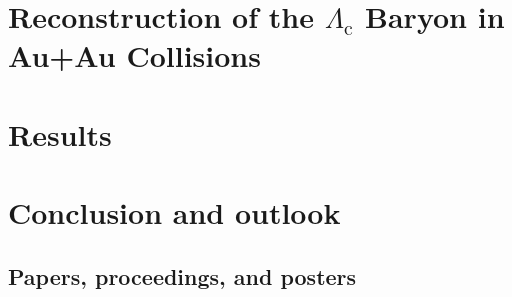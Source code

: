 \documentclass[a4paper,titlepage,11pt,twoside,openright]{report} %
\newcommand{\Lambdac}{\ensuremath{{\Lambda_\text{c}}}}
\begin{document}


\cleardoublepage
\chapter{Reconstruction of the $\Lambda_\text{c}$ Baryon in Au+Au Collisions}


\cleardoublepage
\chapter{Results}


\cleardoublepage
\chapter{Conclusion and outlook} \label{conclusion}





\cleardoublepage


\cleardoublepage
\begin{appendices}
\chapter{Papers, proceedings, and posters}

\end{appendices}
\end{document}
